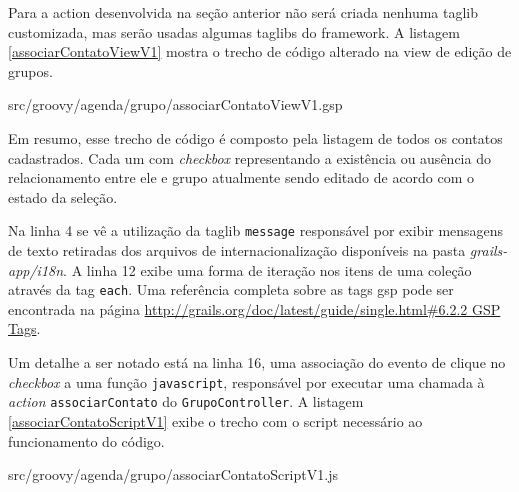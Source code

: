 \documentclass[12pt]{article}
\begin{document}
    Para a action desenvolvida na seção anterior não será criada nenhuma taglib 
    customizada, mas serão usadas algumas taglibs do framework. A listagem \ref{associarContatoViewV1}
    mostra o trecho de código alterado na view de edição de grupos.
    
    
                   {src/groovy/agenda/grupo/associarContatoViewV1.gsp}
    
    Em resumo, esse trecho de código é composto pela listagem de todos os
    contatos cadastrados. Cada um com \emph{checkbox} representando a existência 
    ou ausência do relacionamento entre ele e grupo atualmente sendo editado 
    de acordo com o estado da seleção.
    
    Na linha 4 se vê a utilização da taglib \texttt{message} responsável por exibir
    mensagens de texto retiradas dos arquivos de internacionalização disponíveis 
    na pasta \emph{grails-app/i18n}. A linha 12 exibe uma forma de iteração nos 
    itens de uma coleção através da tag \texttt{each}. Uma referência completa 
    sobre as tags gsp pode ser encontrada na página \url{http://grails.org/doc/latest/guide/single.html#6.2.2 GSP Tags}. 
    
    Um detalhe a ser notado está na linha 16, uma associação do evento de clique 
    no \emph{checkbox} a uma função \texttt{javascript}, responsável por executar 
    uma chamada à \emph{action} \texttt{associarContato} do \texttt{GrupoController}.
    A listagem \ref{associarContatoScriptV1} exibe o trecho com o script necessário
    ao funcionamento do código.
    
    
                   {src/groovy/agenda/grupo/associarContatoScriptV1.js}
    
    
    
%           



\end{document}

